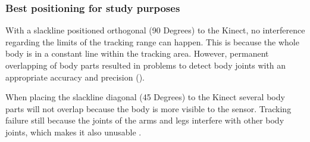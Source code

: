 
\subsubsection{Best positioning for study purposes }

With a slackline positioned orthogonal (90 Degrees) to the Kinect, no interference regarding the limits of the tracking range can happen. This is because the whole body is in a constant line within the tracking area. However, permanent overlapping of body parts resulted in problems to detect body joints with an appropriate accuracy and precision (\textbf{}).

When placing the slackline diagonal (45 Degrees) to the Kinect several body parts will not overlap because the body is more visible to the sensor.
Tracking failure still because the joints of the arms and legs interfere with other body joints, which makes it also unusable \textbf{}. 

